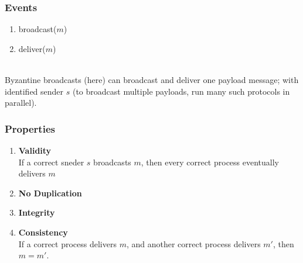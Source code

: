 \documentclass{article}
\begin{document}
\begin{adjustwidth}{2em}{2em}
\begin{adjustwidth}{2em}{2em}
			\subsubsection{Events}
			\begin{adjustwidth}{2em}{}
				\begin{enumerate}[-]
					\item broadcast($m$)
					\item deliver($m$)					
				\end{enumerate}
				\hfill \\
				Byzantine broadcasts (here) can broadcast and deliver one payload message; with identified sender $s$ (to broadcast multiple payloads, run many such protocols in parallel).
			\end{adjustwidth}
			\subsubsection{Properties}
			\begin{adjustwidth}{2em}{}
				\begin{enumerate}[-]
					\item \textbf{Validity} \\
					If a correct sneder $s$ broadcasts $m$, then every correct process eventually delivers $m$
					\item \textbf{No Duplication}
					\item \textbf{Integrity}
					\item \textbf{Consistency} \\
					If a correct process delivers $m$, and another correct process delivers $m'$, then $m = m'$.
				\end{enumerate}
			\end{adjustwidth}
		\end{adjustwidth}

\end{adjustwidth}
\end{document}
